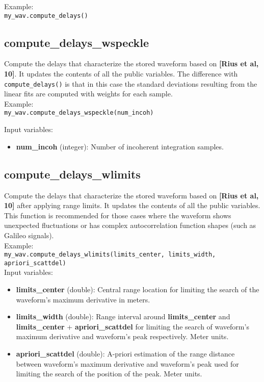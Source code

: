 Example:\\

\texttt{my\_wav.compute\_delays()}\\


\subsection{compute\_delays\_wspeckle}

Compute the delays that characterize the stored waveform based on {\bf [Rius et al, 10]}. It updates the contents of all the public variables. The difference with \texttt{compute\_delays()} is that in this case the standard deviations resulting from the linear fits are computed with weights for each sample.\\

Example:\\

\texttt{my\_wav.compute\_delays\_wspeckle(num\_incoh)}

Input variables:
\begin{itemize}
\item {\bf num\_incoh} (integer): Number of incoherent integration samples.
\end{itemize}


\subsection{compute\_delays\_wlimits}

Compute the delays that characterize the stored waveform based on {\bf [Rius et al, 10]} after applying range limits. It updates the contents of all the public variables. This function is recommended for those cases where the waveform shows unexpected fluctuations or has complex autocorrelation function shapes (such as Galileo signals).\\

Example:\\

\texttt{my\_wav.compute\_delays\_wlimits(limits\_center, limits\_width, apriori\_scattdel)}\\

Input variables:
\begin{itemize}
\item {\bf limits\_center} (double): Central range location for limiting the search of the waveform's maximum derivative in meters.
\item {\bf limits\_width} (double): Range interval around {\bf limits\_center} and {\bf limits\_center} + {\bf apriori\_scattdel} for limiting the search of waveform's maximum derivative and waveform's peak respectively. Meter units. 
\item {\bf apriori\_scattdel} (double): A-priori estimation of the range distance between waveform's maximum derivative and waveform's peak used for limiting the search of the position of the peak. Meter units.
\end{itemize}


